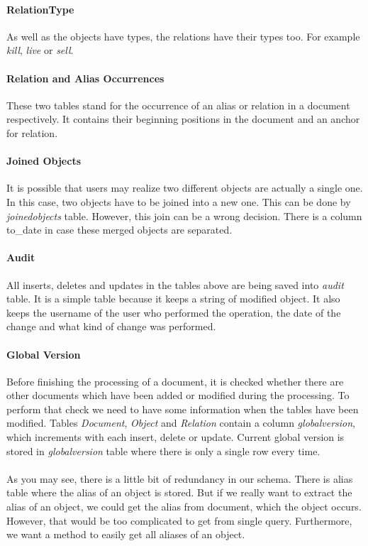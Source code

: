 \paragraph{RelationType} As well as the objects have types, the relations have their types too. For example \emph{kill}, \emph{live} or \emph{sell}.

\paragraph{Relation and Alias Occurrences} These two tables stand for the
occurrence of an alias or relation in a document respectively. It contains their
beginning positions in the document  and an anchor for relation. 

\paragraph{Joined Objects} It is possible that users may realize two different
objects are actually a single one. In this case, two objects have to be joined
into a new one. This can be done by \emph{joinedobjects} table. However, this
join can be a wrong decision. There is a column to\_{}date in case these merged objects are separated.

\paragraph{Audit} All inserts, deletes and updates in the tables above are being
saved into \emph{audit} table. It is a simple table because it keeps a string of
modified object. It also keeps the username of the user who performed the
operation, the date of the change and what kind of change was performed.
 
\paragraph{Global Version} Before finishing the processing of a document, it is
checked whether there are other documents which have been added or modified
during the processing. To perform that check we need to have some information
when the tables have been modified. Tables \emph{Document}, \emph{Object} and
\emph{Relation} contain a column \emph{globalversion}, which increments with
each insert, delete or update. Current global version is stored in
\emph{globalversion} table where there is only a single row every time.

\paragraph{} As you may see, there is a little bit of redundancy in our schema.
There is alias table where the alias of an object is stored. But if we really
want to extract the alias of an object, we could get the alias from document,
which the object occurs. However, that would be too complicated to get from
single query. Furthermore, we want a method to easily get all aliases of an
object.

